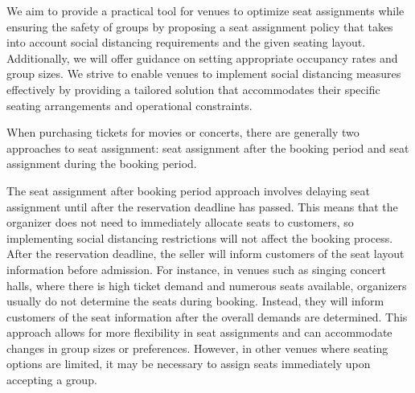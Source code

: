 We aim to provide a practical tool for venues to optimize seat assignments while ensuring the safety of groups by proposing a seat assignment policy that takes into account social distancing requirements and the given seating layout. Additionally, we will offer guidance on setting appropriate occupancy rates and group sizes. We strive to enable venues to implement social distancing measures effectively by providing a tailored solution that accommodates their specific seating arrangements and operational constraints.



When purchasing tickets for movies or concerts, there are generally two approaches to seat assignment: seat assignment after the booking period and seat assignment during the booking period.

The seat assignment after booking period approach involves delaying seat assignment until after the reservation deadline has passed. This means that the organizer does not need to immediately allocate seats to customers, so implementing social distancing restrictions will not affect the booking process. After the reservation deadline, the seller will inform customers of the seat layout information before admission. For instance, in venues such as singing concert halls, where there is high ticket demand and numerous seats available, organizers usually do not determine the seats during booking. Instead, they will inform customers of the seat information after the overall demands are determined. This approach allows for more flexibility in seat assignments and can accommodate changes in group sizes or preferences. However, in other venues where seating options are limited, it may be necessary to assign seats immediately upon accepting a group.




